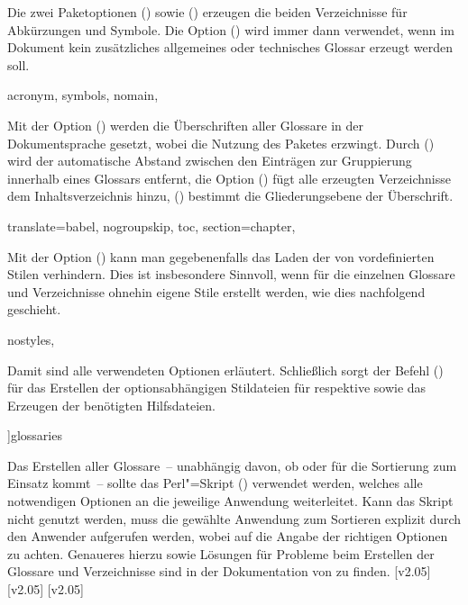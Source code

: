 \documentclass[%
  english,ngerman,%
  cdgeometry=no,DIV=12,automark,%
]{tudscrartcl}
\begin{document}
Die zwei Paketoptionen () sowie 
() erzeugen die beiden Verzeichnisse für 
Abkürzungen und Symbole. Die Option () wird 
immer dann verwendet, wenn im Dokument kein zusätzliches allgemeines oder 
technisches Glossar erzeugt werden soll.
%
\begin{Preamble}
  acronym,%
  symbols,%
  nomain,%
\end{Preamble}
%
Mit der Option () werden die 
Überschriften aller Glossare in der Dokumentsprache gesetzt, wobei 
 die Nutzung des Paketes  erzwingt. 
Durch () wird der automatische Abstand 
zwischen den Einträgen zur Gruppierung innerhalb eines Glossars entfernt, die 
Option () fügt alle erzeugten Verzeichnisse 
dem Inhaltsverzeichnis hinzu, () bestimmt 
die Gliederungsebene der Überschrift.
%
\begin{Preamble}
  translate=babel,%
  nogroupskip,%
  toc,%
  section=chapter,%
\end{Preamble}
%
Mit der Option () kann man gegebenenfalls 
das Laden der von  vordefinierten Stilen verhindern. Dies 
ist insbesondere Sinnvoll, wenn für die einzelnen Glossare und Verzeichnisse 
ohnehin eigene Stile erstellt werden, wie dies nachfolgend geschieht.
%
\begin{Preamble}
  nostyles,%
\end{Preamble}
%
Damit sind alle verwendeten Optionen erläutert. Schließlich sorgt der Befehl 
() für das Erstellen der 
optionsabhängigen Stildateien für  respektive 
 sowie das Erzeugen der benötigten Hilfsdateien.
%
\begin{Preamble}
]{glossaries}
\makeglossaries
\end{Preamble}
\begin{Preamble+}
}%

\AfterPackage*{glossaries}{%
\end{Preamble+}
Das Erstellen aller Glossare~-- unabhängig davon, ob  oder 
 für die Sortierung zum Einsatz kommt~-- sollte das 
Perl"=Skript () verwendet werden, 
welches alle notwendigen Optionen an die jeweilige Anwendung weiterleitet. Kann 
das Skript nicht genutzt werden, muss die gewählte Anwendung zum Sortieren 
explizit durch den Anwender aufgerufen werden, wobei auf die Angabe der 
richtigen Optionen zu achten. Genaueres hierzu sowie Lösungen für Probleme beim 
Erstellen der Glossare und Verzeichnisse sind in der Dokumentation von 
 zu finden.
[v2.05]
[v2.05]
[v2.05]
\end{document}
